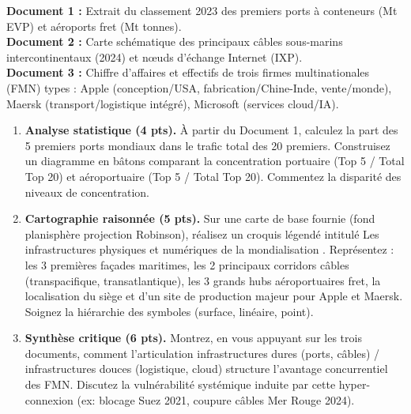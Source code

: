 \documentclass[11pt]{article}
\begin{document}
\begin{exercice}
\textbf{Document 1 :} Extrait du classement 2023 des premiers ports à conteneurs (Mt EVP) et aéroports fret (Mt tonnes).\\
\textbf{Document 2 :} Carte schématique des principaux câbles sous-marins intercontinentaux (2024) et nœuds d'échange Internet (IXP).\\
\textbf{Document 3 :} Chiffre d'affaires et effectifs de trois firmes multinationales (FMN) types : Apple (conception/USA, fabrication/Chine-Inde, vente/monde), Maersk (transport/logistique intégré), Microsoft (services cloud/IA).

\begin{enumerate}
    \item \textbf{Analyse statistique (4 pts).} À partir du Document 1, calculez la part des 5 premiers ports mondiaux dans le trafic total des 20 premiers. Construisez un diagramme en bâtons comparant la concentration portuaire (Top 5 / Total Top 20) et aéroportuaire (Top 5 / Total Top 20). Commentez la disparité des niveaux de concentration.
    \item \textbf{Cartographie raisonnée (5 pts).} Sur une carte de base fournie (fond planisphère projection Robinson), réalisez un croquis légendé intitulé \og Les infrastructures physiques et numériques de la mondialisation \fg. Représentez : les 3 premières façades maritimes, les 2 principaux corridors câbles (transpacifique, transatlantique), les 3 grands hubs aéroportuaires fret, la localisation du siège et d'un site de production majeur pour Apple et Maersk. Soignez la hiérarchie des symboles (surface, linéaire, point).
    \item \textbf{Synthèse critique (6 pts).} Montrez, en vous appuyant sur les trois documents, comment l'articulation \og infrastructures dures (ports, câbles) / infrastructures douces (logistique, cloud) \fg structure l'avantage concurrentiel des FMN. Discutez la vulnérabilité systémique induite par cette hyper-connexion (ex: blocage Suez 2021, coupure câbles Mer Rouge 2024).
\end{enumerate}
\end{exercice}
\end{document}
